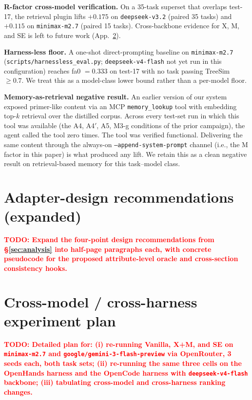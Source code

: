 \documentclass{article}
\newcommand{\todo}[1]{\textcolor{red}{\textbf{TODO: #1}}}
\begin{document}
\textbf{R-factor cross-model verification.} On a 35-task superset that overlaps test-17, the retrieval plugin lifts $+0.175$ on \texttt{deepseek-v3.2} (paired 35 tasks) and $+0.115$ on \texttt{minimax-m2.7} (paired 15 tasks). Cross-backbone evidence for X, M, and SE is left to future work (App.~\ref{app:future-work}).

\textbf{Harness-less floor.} A one-shot direct-prompting baseline on \texttt{minimax-m2.7} (\texttt{scripts/harnessless\_eval.py}; \texttt{deepseek-v4-flash} not yet run in this configuration) reaches fa0 $= 0.333$ on test-17 with no task passing TreeSim $\geq 0.7$. We treat this as a model-class lower bound rather than a per-model floor.

\textbf{Memory-as-retrieval negative result.} An earlier version of our system exposed primer-like content via an MCP \texttt{memory\_lookup} tool with embedding top-$k$ retrieval over the distilled corpus. Across every test-set run in which this tool was available (the A4, A4$'$, A5, M3-g conditions of the prior campaign), the agent called the tool zero times. The tool was verified functional. Delivering the same content through the always-on \texttt{--append-system-prompt} channel (i.e., the M factor in this paper) is what produced any lift. We retain this as a clean negative result on retrieval-based memory for this task--model class.

\section{Adapter-design recommendations (expanded)}
\label{app:design-recs}

\todo{Expand the four-point design recommendations from \S\ref{sec:analysis} into half-page paragraphs each, with concrete pseudocode for the proposed attribute-level oracle and cross-section consistency hooks.}

\section{Cross-model / cross-harness experiment plan}
\label{app:future-work}

\todo{Detailed plan for: (i) re-running Vanilla, X+M, and SE on \texttt{minimax-m2.7} and \texttt{google/gemini-3-flash-preview} via OpenRouter, 3 seeds each, both task sets; (ii) re-running the same three cells on the OpenHands harness and the OpenCode harness with \texttt{deepseek-v4-flash} backbone; (iii) tabulating cross-model and cross-harness ranking changes.}
\end{document}
